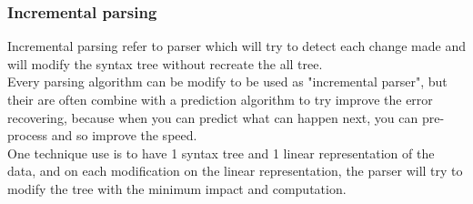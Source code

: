 \subsubsection{Incremental parsing}
Incremental parsing refer to parser which will try to detect each change made and will modify the syntax tree without recreate the all tree.\cite{grune2008parsing}\cite{horspool1990incremental}
\\Every parsing algorithm can be modify to be used as "incremental parser", but their are often combine with a prediction algorithm to try improve the error recovering, because when you can predict what can happen next, you can pre-process and so improve the speed.
\\One technique use is to have 1 syntax tree and 1 linear representation of the data, and on each modification on the linear representation, the parser will try to modify the tree with the minimum impact and computation.


